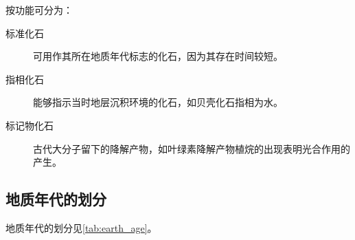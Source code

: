 按功能可分为：

\begin{description}
	\item[标准化石] 可用作其所在地质年代标志的化石，因为其存在时间较短。
	\item[指相化石] 能够指示当时地层沉积环境的化石，如贝壳化石指相为水。
	\item[标记物化石] 古代大分子留下的降解产物，如叶绿素降解产物植烷的出现表明光合作用的产生。
\end{description}

\subsection{地质年代的划分}

地质年代的划分见\autoref{tab:earth_age}。

